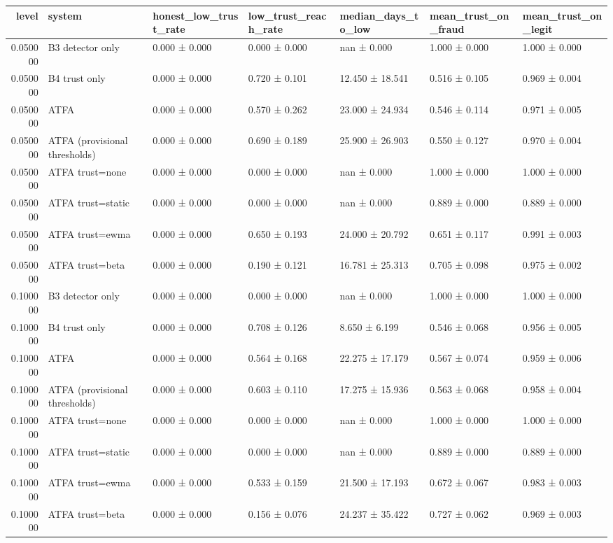 \begin{tabular}{rllllll}
\toprule
level & system & honest\_low\_trust\_rate & low\_trust\_reach\_rate & median\_days\_to\_low & mean\_trust\_on\_fraud & mean\_trust\_on\_legit \\
\midrule
0.050000 & B3 detector only & 0.000 ± 0.000 & 0.000 ± 0.000 & nan ± 0.000 & 1.000 ± 0.000 & 1.000 ± 0.000 \\
0.050000 & B4 trust only & 0.000 ± 0.000 & 0.720 ± 0.101 & 12.450 ± 18.541 & 0.516 ± 0.105 & 0.969 ± 0.004 \\
0.050000 & ATFA & 0.000 ± 0.000 & 0.570 ± 0.262 & 23.000 ± 24.934 & 0.546 ± 0.114 & 0.971 ± 0.005 \\
0.050000 & ATFA (provisional thresholds) & 0.000 ± 0.000 & 0.690 ± 0.189 & 25.900 ± 26.903 & 0.550 ± 0.127 & 0.970 ± 0.004 \\
0.050000 & ATFA trust=none & 0.000 ± 0.000 & 0.000 ± 0.000 & nan ± 0.000 & 1.000 ± 0.000 & 1.000 ± 0.000 \\
0.050000 & ATFA trust=static & 0.000 ± 0.000 & 0.000 ± 0.000 & nan ± 0.000 & 0.889 ± 0.000 & 0.889 ± 0.000 \\
0.050000 & ATFA trust=ewma & 0.000 ± 0.000 & 0.650 ± 0.193 & 24.000 ± 20.792 & 0.651 ± 0.117 & 0.991 ± 0.003 \\
0.050000 & ATFA trust=beta & 0.000 ± 0.000 & 0.190 ± 0.121 & 16.781 ± 25.313 & 0.705 ± 0.098 & 0.975 ± 0.002 \\
0.100000 & B3 detector only & 0.000 ± 0.000 & 0.000 ± 0.000 & nan ± 0.000 & 1.000 ± 0.000 & 1.000 ± 0.000 \\
0.100000 & B4 trust only & 0.000 ± 0.000 & 0.708 ± 0.126 & 8.650 ± 6.199 & 0.546 ± 0.068 & 0.956 ± 0.005 \\
0.100000 & ATFA & 0.000 ± 0.000 & 0.564 ± 0.168 & 22.275 ± 17.179 & 0.567 ± 0.074 & 0.959 ± 0.006 \\
0.100000 & ATFA (provisional thresholds) & 0.000 ± 0.000 & 0.603 ± 0.110 & 17.275 ± 15.936 & 0.563 ± 0.068 & 0.958 ± 0.004 \\
0.100000 & ATFA trust=none & 0.000 ± 0.000 & 0.000 ± 0.000 & nan ± 0.000 & 1.000 ± 0.000 & 1.000 ± 0.000 \\
0.100000 & ATFA trust=static & 0.000 ± 0.000 & 0.000 ± 0.000 & nan ± 0.000 & 0.889 ± 0.000 & 0.889 ± 0.000 \\
0.100000 & ATFA trust=ewma & 0.000 ± 0.000 & 0.533 ± 0.159 & 21.500 ± 17.193 & 0.672 ± 0.067 & 0.983 ± 0.003 \\
0.100000 & ATFA trust=beta & 0.000 ± 0.000 & 0.156 ± 0.076 & 24.237 ± 35.422 & 0.727 ± 0.062 & 0.969 ± 0.003 \\

\end{tabular}
